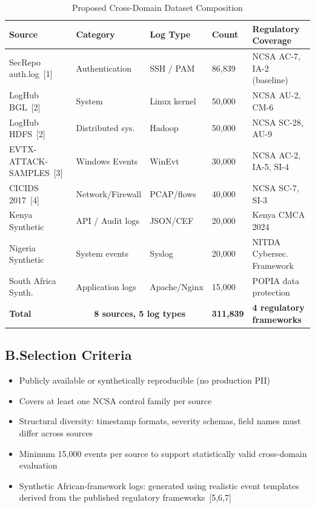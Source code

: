 \documentclass[12pt]{article}
\begin{document}
\begin{table}[h]
\centering
\caption{Proposed Cross-Domain Dataset Composition}
\label{tab:dataset}
\begin{tabular}{@{}p{3.5cm}p{2.5cm}p{2cm}p{2cm}p{3cm}@{}}
\toprule
\textbf{Source} & \textbf{Category} & \textbf{Log Type} & \textbf{Count} & \textbf{Regulatory Coverage} \\
\midrule
SecRepo auth.log~[1] & Authentication & SSH / PAM & 86,839 & NCSA AC-7, IA-2 (baseline) \\
LogHub BGL~[2] & System & Linux kernel & 50,000 & NCSA AU-2, CM-6 \\
LogHub HDFS~[2] & Distributed sys. & Hadoop & 50,000 & NCSA SC-28, AU-9 \\
EVTX-ATTACK-SAMPLES~[3] & Windows Events & WinEvt & 30,000 & NCSA AC-2, IA-5, SI-4 \\
CICIDS 2017~[4] & Network/Firewall & PCAP/flows & 40,000 & NCSA SC-7, SI-3 \\
Kenya Synthetic & API / Audit logs & JSON/CEF & 20,000 & Kenya CMCA 2024 \\
Nigeria Synthetic & System events & Syslog & 20,000 & NITDA Cybersec. Framework \\
South Africa Synth. & Application logs & Apache/Nginx & 15,000 & POPIA data protection \\
\midrule
\textbf{Total} & \multicolumn{2}{c}{\textbf{8 sources, 5 log types}} & \textbf{311,839} & \textbf{4 regulatory frameworks} \\
\bottomrule
\end{tabular}
\end{table}

\subsection*{B.\quad Selection Criteria}

\begin{itemize}
    \item Publicly available or synthetically reproducible (no production PII)
    \item Covers at least one NCSA control family per source
    \item Structural diversity: timestamp formats, severity schemas, field names must differ across sources
    \item Minimum 15,000 events per source to support statistically valid cross-domain evaluation
    \item Synthetic African-framework logs: generated using realistic event templates derived from the published regulatory frameworks~[5,6,7]
\end{itemize}
\end{document}
